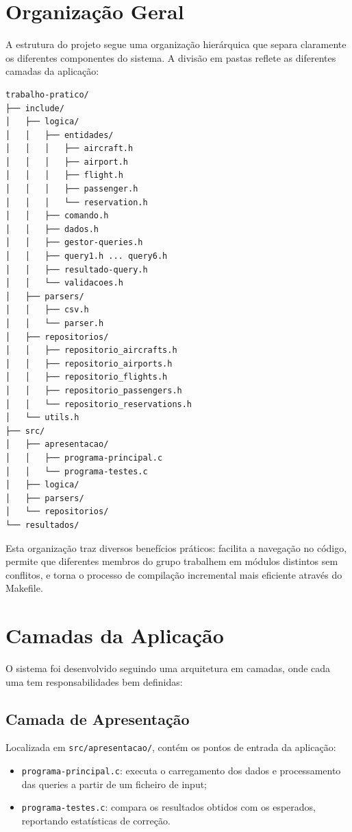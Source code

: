 \documentclass[a4paper,12pt]{scrreprt}
\begin{document}
\section{Organização Geral}

A estrutura do projeto segue uma organização hierárquica que separa claramente os diferentes componentes do sistema. A divisão em pastas reflete as diferentes camadas da aplicação:

\begin{verbatim}
trabalho-pratico/
├── include/
│   ├── logica/
│   │   ├── entidades/
│   │   │   ├── aircraft.h
│   │   │   ├── airport.h
│   │   │   ├── flight.h
│   │   │   ├── passenger.h
│   │   │   └── reservation.h
│   │   ├── comando.h
│   │   ├── dados.h
│   │   ├── gestor-queries.h
│   │   ├── query1.h ... query6.h
│   │   ├── resultado-query.h
│   │   └── validacoes.h
│   ├── parsers/
│   │   ├── csv.h
│   │   └── parser.h
│   ├── repositorios/
│   │   ├── repositorio_aircrafts.h
│   │   ├── repositorio_airports.h
│   │   ├── repositorio_flights.h
│   │   ├── repositorio_passengers.h
│   │   └── repositorio_reservations.h
│   └── utils.h
├── src/
│   ├── apresentacao/
│   │   ├── programa-principal.c
│   │   └── programa-testes.c
│   ├── logica/
│   ├── parsers/
│   └── repositorios/
└── resultados/
\end{verbatim}

Esta organização traz diversos benefícios práticos: facilita a navegação no código, permite que diferentes membros do grupo trabalhem em módulos distintos sem conflitos, e torna o processo de compilação incremental mais eficiente através do Makefile.

\section{Camadas da Aplicação}

O sistema foi desenvolvido seguindo uma arquitetura em camadas, onde cada uma tem responsabilidades bem definidas:

\subsection{Camada de Apresentação}

Localizada em \texttt{src/apresentacao/}, contém os pontos de entrada da aplicação:
\begin{itemize}
    \item \texttt{programa-principal.c}: executa o carregamento dos dados e processamento das queries a partir de um ficheiro de input;
    \item \texttt{programa-testes.c}: compara os resultados obtidos com os esperados, reportando estatísticas de correção.
\end{itemize}
\end{document}
